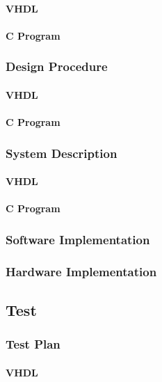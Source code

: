 \documentclass{article}
\begin{document}
    \paragraph{VHDL}
    \paragraph{C Program} 

    \subsubsection{Design Procedure}
    \paragraph{VHDL}
    \paragraph{C Program}

    \subsubsection{System Description}
    \paragraph{VHDL}
    \paragraph{C Program}

    \subsubsection{Software Implementation}
    \subsubsection{Hardware Implementation}

  \subsection{Test}
    \subsubsection{Test Plan}
    \paragraph{VHDL}
\end{document}
